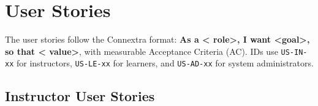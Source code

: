 \section{User Stories}
\label{sec:user-stories}

The user stories follow the Connextra format: \textbf{As a \textless
role\textgreater, I want \textless goal\textgreater, so that \textless
value\textgreater}, with measurable Acceptance Criteria (AC). IDs use
\texttt{US-IN-xx} for instructors, \texttt{US-LE-xx} for learners, and
\texttt{US-AD-xx} for system administrators.

\subsection{Instructor User Stories}

\begingroup
\scriptsize
\setlength{\tabcolsep}{3pt}
